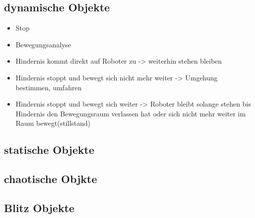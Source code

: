 \subsection{dynamische Objekte}
		\begin{itemize}
		\item Stop
		\item Bewegungsanalyse
		\item Hindernis kommt direkt auf Roboter zu -> weiterhin stehen bleiben
		\item Hindernis stoppt und bewegt sich nicht mehr weiter -> Umgehung bestimmen, umfahren
		\item Hindernis stoppt und bewegt sich weiter -> Roboter bleibt solange stehen bis Hindernis den Bewegungsraum verlassen hat oder sich nicht mehr weiter im Raum bewegt(stillstand) 
		\end{itemize}
	\subsection{statische Objekte}
	\subsection{chaotische Objkte}
	\subsection{Blitz Objekte}
